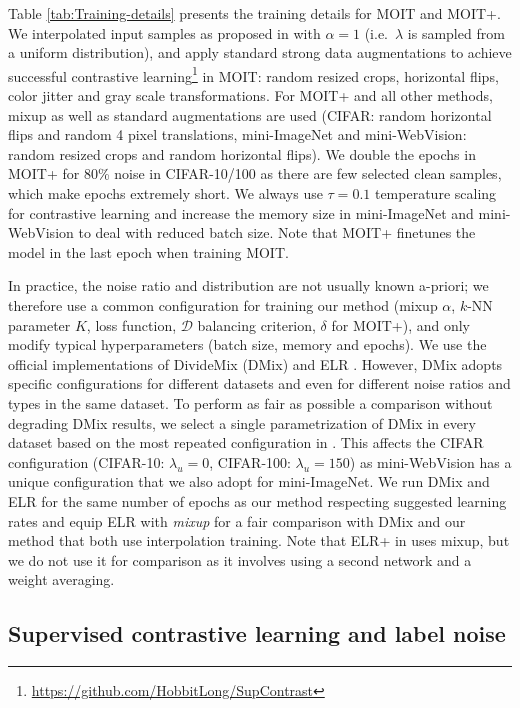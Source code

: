 \documentclass[final]{cvpr}
\begin{document}
Table \ref{tab:Training-details} presents the training details for MOIT and MOIT+. We interpolated input samples as proposed in \cite{2018_ICLR_mixup} with $\alpha=1$ (i.e.~$\lambda$ is sampled from a uniform distribution), and apply standard strong data augmentations to achieve successful contrastive learning\footnote{\url{https://github.com/HobbitLong/SupContrast}} in MOIT: random resized crops, horizontal flips, color jitter and gray scale transformations. For MOIT+ and all other methods, mixup as well as standard augmentations are used (CIFAR: random horizontal flips and random 4 pixel translations, mini-ImageNet and mini-WebVision: random resized crops and random horizontal flips). We double the epochs in MOIT+ for 80\% noise in CIFAR-10/100 as there are few selected clean samples, which make epochs extremely short. We always use $\tau=0.1$ temperature scaling for contrastive learning and increase the memory size in mini-ImageNet and mini-WebVision to deal with reduced batch size. Note that MOIT+ finetunes the model in the last epoch when training MOIT.

In practice, the noise ratio and distribution are not usually known a-priori; we therefore use a common configuration for training our method (mixup $\alpha$, $k$-NN parameter $K$, loss function, $\mathcal{D}$ balancing criterion, $\delta$ for MOIT+), and only modify typical hyperparameters (batch size, memory and epochs). We use the official implementations of DivideMix (DMix) \cite{2020_ICLR_DivideMix} and ELR \cite{2020_NeurIPS_EarlyReg}. However, DMix adopts specific configurations for different datasets and even for different noise ratios and types in the same dataset. To perform as fair as possible a comparison without degrading DMix results, we select a single parametrization of DMix in every dataset based on the most repeated configuration in \cite{2020_ICLR_DivideMix}. This affects the CIFAR configuration (CIFAR-10: $\lambda_{u}=0$, CIFAR-100: $\lambda_{u}=150$) as mini-WebVision has a unique configuration that we also adopt for mini-ImageNet. We run DMix and ELR for the same number of epochs as our method respecting suggested learning rates and equip ELR with \textit{mixup} for a fair comparison with DMix and our method that both use interpolation training. Note that ELR+ in \cite{2020_NeurIPS_EarlyReg} uses mixup, but we do not use it for comparison as it involves using a second network and a weight averaging.


\subsection{Supervised contrastive learning and label noise\label{subsec:ICLexperiments}}
\end{document}
